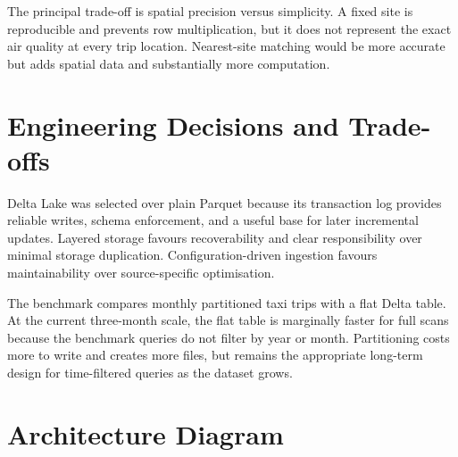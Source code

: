 \documentclass[11pt]{article}
\begin{document}
The principal trade-off is spatial precision versus simplicity. A fixed site is reproducible and prevents row multiplication, but it does not represent the exact air quality at every trip location. Nearest-site matching would be more accurate but adds spatial data and substantially more computation.

\section{Engineering Decisions and Trade-offs}
Delta Lake was selected over plain Parquet because its transaction log provides reliable writes, schema enforcement, and a useful base for later incremental updates. Layered storage favours recoverability and clear responsibility over minimal storage duplication. Configuration-driven ingestion favours maintainability over source-specific optimisation.

The benchmark compares monthly partitioned taxi trips with a flat Delta table. At the current three-month scale, the flat table is marginally faster for full scans because the benchmark queries do not filter by year or month. Partitioning costs more to write and creates more files, but remains the appropriate long-term design for time-filtered queries as the dataset grows.

\section{Architecture Diagram}
\begin{center}
\end{center}
\end{document}
